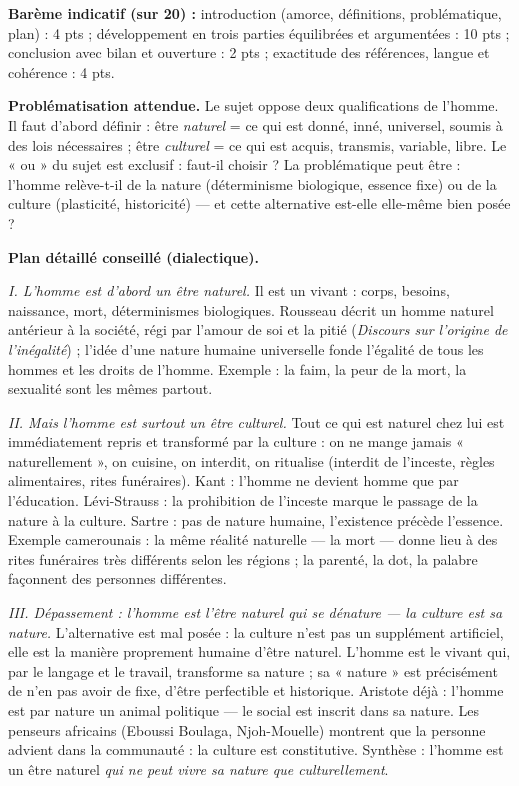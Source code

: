 \documentclass[11pt]{article}
\begin{document}
\begin{corrige}
\textbf{Barème indicatif (sur 20) :} introduction (amorce, définitions, problématique, plan) : 4 pts ; développement en trois parties équilibrées et argumentées : 10 pts ; conclusion avec bilan et ouverture : 2 pts ; exactitude des références, langue et cohérence : 4 pts.

\textbf{Problématisation attendue.} Le sujet oppose deux qualifications de l'homme. Il faut d'abord définir : être \emph{naturel} = ce qui est donné, inné, universel, soumis à des lois nécessaires ; être \emph{culturel} = ce qui est acquis, transmis, variable, libre. Le « ou » du sujet est exclusif : faut-il choisir ? La problématique peut être : l'homme relève-t-il de la nature (déterminisme biologique, essence fixe) ou de la culture (plasticité, historicité) — et cette alternative est-elle elle-même bien posée ?

\textbf{Plan détaillé conseillé (dialectique).}

\emph{I. L'homme est d'abord un être naturel.} Il est un vivant : corps, besoins, naissance, mort, déterminismes biologiques. Rousseau décrit un homme naturel antérieur à la société, régi par l'amour de soi et la pitié (\emph{Discours sur l'origine de l'inégalité}) ; l'idée d'une nature humaine universelle fonde l'égalité de tous les hommes et les droits de l'homme. Exemple : la faim, la peur de la mort, la sexualité sont les mêmes partout.

\emph{II. Mais l'homme est surtout un être culturel.} Tout ce qui est naturel chez lui est immédiatement repris et transformé par la culture : on ne mange jamais « naturellement », on cuisine, on interdit, on ritualise (interdit de l'inceste, règles alimentaires, rites funéraires). Kant : l'homme ne devient homme que par l'éducation. Lévi-Strauss : la prohibition de l'inceste marque le passage de la nature à la culture. Sartre : pas de nature humaine, l'existence précède l'essence. Exemple camerounais : la même réalité naturelle — la mort — donne lieu à des rites funéraires très différents selon les régions ; la parenté, la dot, la palabre façonnent des personnes différentes.

\emph{III. Dépassement : l'homme est l'être naturel qui se dénature — la culture est sa nature.} L'alternative est mal posée : la culture n'est pas un supplément artificiel, elle est la manière proprement humaine d'être naturel. L'homme est le vivant qui, par le langage et le travail, transforme sa nature ; sa « nature » est précisément de n'en pas avoir de fixe, d'être perfectible et historique. Aristote déjà : l'homme est par nature un animal politique — le social est inscrit dans sa nature. Les penseurs africains (Eboussi Boulaga, Njoh-Mouelle) montrent que la personne advient dans la communauté : la culture est constitutive. Synthèse : l'homme est un être naturel \emph{qui ne peut vivre sa nature que culturellement}.


\end{corrige}
\end{document}
